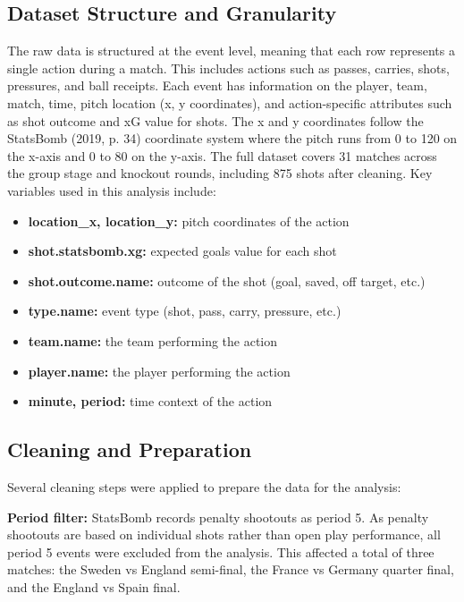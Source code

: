 \documentclass[
  11pt,
  a4paper,
  DIV=11,
  numbers=noendperiod]{scrartcl}
\begin{document}
\subsection{Dataset Structure and
Granularity}\label{dataset-structure-and-granularity}

The raw data is structured at the event level, meaning that each row
represents a single action during a match. This includes actions such as
passes, carries, shots, pressures, and ball receipts. Each event has
information on the player, team, match, time, pitch location (x, y
coordinates), and action-specific attributes such as shot outcome and xG
value for shots. The x and y coordinates follow the StatsBomb (2019, p.
34) coordinate system where the pitch runs from 0 to 120 on the x-axis
and 0 to 80 on the y-axis. The full dataset covers 31 matches across the
group stage and knockout rounds, including 875 shots after cleaning. Key
variables used in this analysis include:

\begin{itemize}
\item
  \textbf{location\_x, location\_y:} pitch coordinates of the action
\item
  \textbf{shot.statsbomb.xg:} expected goals value for each shot
\item
  \textbf{shot.outcome.name:} outcome of the shot (goal, saved, off
  target, etc.)
\item
  \textbf{type.name:} event type (shot, pass, carry, pressure, etc.)
\item
  \textbf{team.name:} the team performing the action
\item
  \textbf{player.name:} the player performing the action
\item
  \textbf{minute, period:} time context of the action
\end{itemize}

\subsection{Cleaning and Preparation}\label{cleaning-and-preparation}

Several cleaning steps were applied to prepare the data for the
analysis:

\textbf{Period filter:} StatsBomb records penalty shootouts as period 5.
As penalty shootouts are based on individual shots rather than open play
performance, all period 5 events were excluded from the analysis. This
affected a total of three matches: the Sweden vs England semi-final, the
France vs Germany quarter final, and the England vs Spain final.
\end{document}
